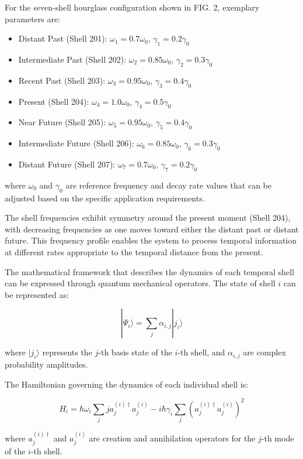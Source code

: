 \documentclass[12pt,letterpaper]{article}
\begin{document}
For the seven-shell hourglass configuration shown in FIG. 2, exemplary parameters are:

\begin{itemize}
    \item Distant Past (Shell 201): $\omega_1 = 0.7\omega_0$, $\gamma_1 = 0.2\gamma_0$
    \item Intermediate Past (Shell 202): $\omega_2 = 0.85\omega_0$, $\gamma_2 = 0.3\gamma_0$
    \item Recent Past (Shell 203): $\omega_3 = 0.95\omega_0$, $\gamma_3 = 0.4\gamma_0$
    \item Present (Shell 204): $\omega_4 = 1.0\omega_0$, $\gamma_4 = 0.5\gamma_0$
    \item Near Future (Shell 205): $\omega_5 = 0.95\omega_0$, $\gamma_5 = 0.4\gamma_0$
    \item Intermediate Future (Shell 206): $\omega_6 = 0.85\omega_0$, $\gamma_6 = 0.3\gamma_0$
    \item Distant Future (Shell 207): $\omega_7 = 0.7\omega_0$, $\gamma_7 = 0.2\gamma_0$
\end{itemize}

where $\omega_0$ and $\gamma_0$ are reference frequency and decay rate values that can be adjusted based on the specific application requirements.

The shell frequencies exhibit symmetry around the present moment (Shell 204), with decreasing frequencies as one moves toward either the distant past or distant future. This frequency profile enables the system to process temporal information at different rates appropriate to the temporal distance from the present.

The mathematical framework that describes the dynamics of each temporal shell can be expressed through quantum mechanical operators. The state of shell $i$ can be represented as:

$$|\Psi_i\rangle = \sum_j \alpha_{i,j} |j_i\rangle$$

where $|j_i\rangle$ represents the $j$-th basis state of the $i$-th shell, and $\alpha_{i,j}$ are complex probability amplitudes.

The Hamiltonian governing the dynamics of each individual shell is:

$$H_i = \hbar\omega_i \sum_j j a_j^{(i)\dagger} a_j^{(i)} - i\hbar\gamma_i \sum_j (a_j^{(i)\dagger} a_j^{(i)})^2$$

where $a_j^{(i)\dagger}$ and $a_j^{(i)}$ are creation and annihilation operators for the $j$-th mode of the $i$-th shell.
\end{document}
